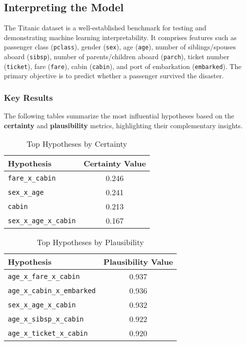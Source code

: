 \documentclass[acmlarge]{acmart}
\begin{document}
\subsection{Interpreting the Model}

The Titanic dataset is a well-established benchmark for testing and demonstrating machine learning interpretability. It comprises features such as passenger class (\texttt{pclass}), gender (\texttt{sex}), age (\texttt{age}), number of siblings/spouses aboard (\texttt{sibsp}), number of parents/children aboard (\texttt{parch}), ticket number (\texttt{ticket}), fare (\texttt{fare}), cabin (\texttt{cabin}), and port of embarkation (\texttt{embarked}). The primary objective is to predict whether a passenger survived the disaster.


\subsubsection{Key Results}

The following tables summarize the most influential hypotheses based on the \textbf{certainty} and \textbf{plausibility} metrics, highlighting their complementary insights.

\begin{table}[H]
    \caption{Top Hypotheses by Certainty}
    \label{tab:top_certainty}
    \centering
    \begin{tabular}{|l|c|}
        \hline
        \textbf{Hypothesis} & \textbf{Certainty Value} \\
        \hline
        \texttt{fare\_x\_cabin} & 0.246 \\
        \texttt{sex\_x\_age} & 0.241 \\
        \texttt{cabin} & 0.213 \\
        \texttt{sex\_x\_age\_x\_cabin} & 0.167 \\
        \hline
    \end{tabular}
\end{table}

\begin{table}[H]
    \caption{Top Hypotheses by Plausibility}
    \label{tab:top_plausibility}
    \centering
    \begin{tabular}{|l|c|}
        \hline
        \textbf{Hypothesis} & \textbf{Plausibility Value} \\
        \hline
        \texttt{age\_x\_fare\_x\_cabin} & 0.937 \\
        \texttt{age\_x\_cabin\_x\_embarked} & 0.936 \\
        \texttt{sex\_x\_age\_x\_cabin} & 0.932 \\
        \texttt{age\_x\_sibsp\_x\_cabin} & 0.922 \\
        \texttt{age\_x\_ticket\_x\_cabin} & 0.920 \\
        \hline
    \end{tabular}
\end{table}
\end{document}
